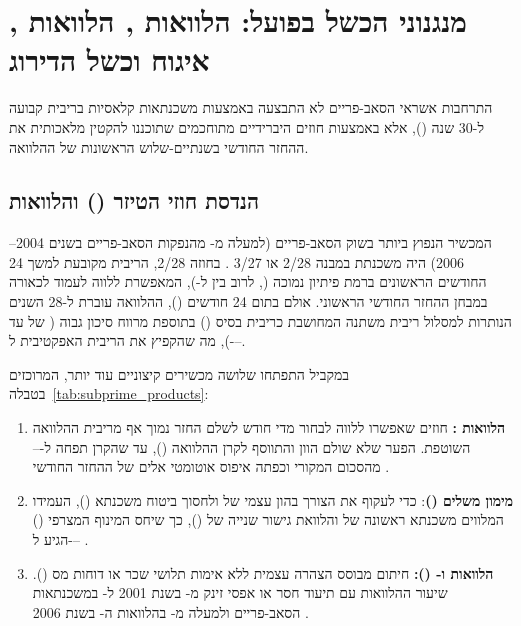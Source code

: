 \section{מנגנוני הכשל בפועל: הלוואות , הלוואות , איגוח וכשל הדירוג}
\label{sec:subprime_mechanisms}

התרחבות אשראי הסאב-פריים לא התבצעה באמצעות משכנתאות קלאסיות בריבית קבועה ל-\num{30} שנה (), אלא באמצעות חוזים היברידיים מתוחכמים שתוכננו להקטין מלאכותית את ההחזר החודשי בשנתיים-שלוש הראשונות של ההלוואה.

\subsection{הנדסת חוזי הטיזר () והלוואות }
המכשיר הנפוץ ביותר בשוק הסאב-פריים (למעלה מ- מהנפקות הסאב-פריים בשנים \num{2004}--\num{2006}) היה משכנתת  במבנה \num{2/28} או \num{3/27} \cite{mayer2009rise,foote2008subprime}. בחוזה \num{2/28}, הריבית מקובעת למשך \num{24} החודשים הראשונים ברמת פיתיון נמוכה (, לרוב בין  ל-), המאפשרת ללווה לעמוד לכאורה במבחן ההחזר החודשי הראשוני. אולם בתום \num{24} חודשים (), ההלוואה עוברת ל-\num{28} השנים הנותרות למסלול ריבית משתנה המחושבת כריבית בסיס () בתוספת מרווח סיכון גבוה ( של  עד ), מה שהקפיץ את הריבית האפקטיבית ל---.

במקביל התפתחו שלושה מכשירים קיצוניים עוד יותר, המרוכזים בטבלה~\ref{tab:subprime_products}:
\begin{enumerate}[label=\textbf{\arabic*.},rightmargin=0.6cm]
  \item \textbf{הלוואות :} חוזים שאפשרו ללווה לבחור מדי חודש לשלם החזר נמוך אף מריבית ההלוואה השוטפת. הפער שלא שולם הוון והתווסף לקרן ההלוואה (), עד שהקרן תפחה ל--- מהסכום המקורי וכפתה איפוס אוטומטי אלים של ההחזר החודשי \cite{mayer2009rise}.
  \item \textbf{מימון משלים ()}: כדי לעקוף את הצורך בהון עצמי של  ולחסוך ביטוח משכנתא (), העמידו המלווים משכנתא ראשונה של  והלוואת גישור שנייה של  (), כך שיחס המינוף המצרפי () הגיע ל--- \cite{mayer2009rise,foote2008subprime}.
  \item \textbf{הלוואות  ו- ():} חיתום מבוסס הצהרה עצמית ללא אימות תלושי שכר או דוחות מס (). שיעור ההלוואות עם תיעוד חסר או אפסי זינק מ- בשנת \num{2001} ל- במשכנתאות הסאב-פריים ולמעלה מ- בהלוואות ה- בשנת \num{2006} \cite{keys2010did,mayer2009rise}.
\end{enumerate}

